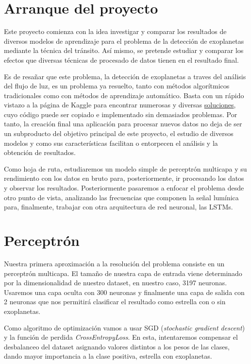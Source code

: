
\section{Arranque del proyecto}

Este proyecto comienza con la idea investigar y comparar los resultados de diversos modelos de aprendizaje para el problema de la detección de exoplanetas mediante la técnica del tránsito. Así mismo, se pretende estudiar y comparar los efectos que diversas técnicas de procesado de datos tienen en el resultado final.

Es de resañar que este problema, la detección de exoplanetas a traves del análisis del flujo de luz, es un problema ya resuelto, tanto con métodos algorítmicos tradicionales como con métodos de aprendizaje automático. Basta con un rápido vistazo a la página de Kaggle para encontrar numerosas y diversas \href{https://www.kaggle.com/keplersmachines/kepler-labelled-time-series-data/kernels}{soluciones}, cuyo código puede ser copiado e implementado sin demasiados problemas. Por tanto, la creación final una aplicación para procesar nuevos datos no deja de ser un subproducto del objetivo principal de este proyecto, el estudio de diversos modelos y como sus características facilitan o entorpecen el análisis y la obtención de resultados.

Como hoja de ruta, estudiaremos un modelo simple de perceptrón multicapa y su rendimiento con los datos en bruto para, posteriormente, ir procesando los datos y observar los resultados. Posteriormente pasaremos a enfocar el problema desde otro punto de vista, analizando las frecuencias que componen la señal lumínica para, finalmente, trabajar con otra arquitectura de red neuronal, las LSTMs.

\section{Perceptrón}

Nuestra primera aproximación a la resolución del problema consiste en un perceptrón multicapa. El tamaño de nuestra capa de entrada viene determinado por la dimensionalidad de nuestro dataset, en nuestro caso, 3197 neuronas. Usaremos una capa oculta con 300 neuronas y finalmente una capa de salida con 2 neuronas que nos permitirá clasificar el resultado como estrella con o sin exoplanetas.

Como algoritmo de optimización vamos a usar SGD (\textit{stochastic gradient descent}) y la función de perdida \textit{CrossEntropyLoss}. En esta, intentaremos compensar el desbalanceo del dataset asignando valores distintos a los pesos de las clases, dando mayor importancia a la clase positiva, estrella con exoplanetas.

